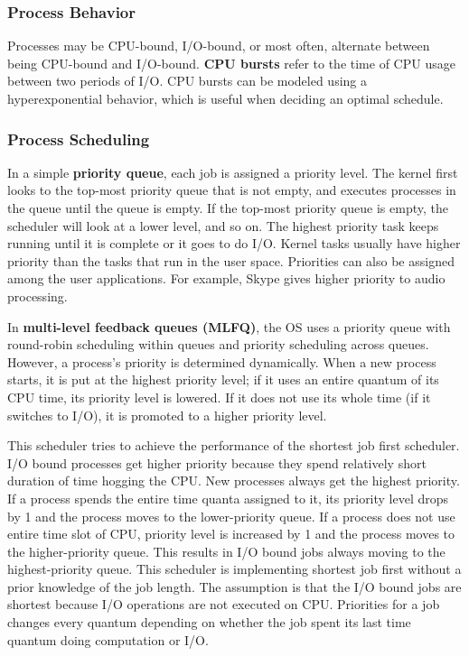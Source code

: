 \documentclass[twoside]{article}
\begin{document}
\subsubsection{Process Behavior}
Processes may be CPU-bound, I/O-bound, or most often, alternate between being CPU-bound and I/O-bound. \textbf{CPU bursts} refer to the time of CPU usage between two periods of I/O. CPU bursts can be modeled using a hyperexponential behavior, which is useful when deciding an optimal schedule. 

\subsubsection{Process Scheduling}
In a simple \textbf{priority queue}, each job is assigned a priority level. The kernel first looks to the top-most priority queue that is not empty, and executes processes in the queue until the queue is empty. If the top-most priority queue is empty, the scheduler will look at a lower level, and so on. The highest priority task keeps running until it is complete or it goes to do I/O. Kernel tasks usually have higher priority than the tasks that run in the user space. Priorities can also be assigned among the user applications. For example, Skype gives higher priority to audio processing.

In \textbf{multi-level feedback queues (MLFQ)}, the OS uses a priority queue with round-robin scheduling within queues and priority scheduling across queues. However, a process's priority is determined dynamically. When a new process starts, it is put at the highest priority level; if it uses an entire quantum of its CPU time, its priority level is lowered. If it does not use its whole time (if it switches to I/O), it is promoted to a higher priority level.

This scheduler tries to achieve the performance of the shortest job first scheduler. I/O bound processes get higher priority because they spend relatively short duration of time hogging the CPU. New processes always get the highest priority. If a process spends the entire time quanta assigned to it, its priority level drops by 1 and the process moves to the lower-priority queue. If a process does not use entire time slot of CPU, priority level is increased by 1 and the process moves to the higher-priority queue. This results in I/O bound jobs always moving to the highest-priority queue. This scheduler is implementing shortest job first without a prior knowledge of the job length. The assumption is that the I/O bound jobs are shortest because I/O operations are not executed on CPU. Priorities for a job changes every quantum depending on whether the job spent its last time quantum doing computation or I/O.
\end{document}
